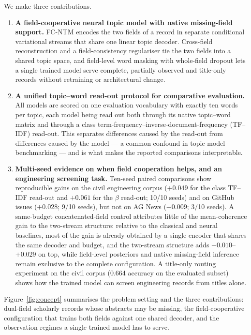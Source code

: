 \documentclass[pdflatex,sn-basic]{sn-jnl}
\newcommand{\fcntm}{FC-NTM}
\begin{document}
We make three contributions.
\begin{enumerate}
\item \textbf{A field-cooperative neural topic model with native missing-field support.}
\fcntm{} encodes the two fields of a record in separate conditional variational streams that
share one linear topic decoder. Cross-field reconstruction and a field-consistency regulariser
tie the two fields into a shared topic space, and field-level word masking with whole-field
dropout lets a single trained model serve complete, partially observed and title-only records
without retraining or architectural change.
\item \textbf{A unified topic--word read-out protocol for comparative evaluation.} All models are
scored on one evaluation vocabulary with exactly ten words per topic, each model being read out
both through its native topic--word matrix and through a class
term-frequency--inverse-document-frequency (TF--IDF) read-out. This separates differences caused
by the read-out from differences caused by the model --- a common confound in topic-model
benchmarking --- and is what makes the reported comparisons interpretable.
\item \textbf{Multi-seed evidence on when field cooperation helps, and an engineering screening
task.} Ten-seed paired comparisons show reproducible gains on the civil engineering
corpus ($+0.049$ for the class TF--IDF read-out and $+0.061$ for the $\beta$ read-out; 10/10
seeds) and on GitHub issues ($+0.028$; 9/10 seeds), but not on AG News ($-0.009$; 3/10 seeds).
A same-budget concatenated-field control attributes little of the mean-coherence gain to the
two-stream structure: relative to the classical and neural baselines, most of the gain is
already obtained by a single encoder that shares the same decoder and budget, and the
two-stream structure adds $+0.010$--$+0.029$ on top, while field-level posteriors and native
missing-field inference remain exclusive to the complete configuration. A title-only routing experiment
on the civil corpus (0.664 accuracy on the evaluated subset) shows how the trained model can
screen engineering records from titles alone.
\end{enumerate}

Figure~\ref{fig:concept} summarises the problem setting and the three contributions: dual-field
scholarly records whose abstracts may be missing, the field-cooperative configuration that
trains both fields against one shared decoder, and the observation regimes a single trained
model has to serve.
\end{document}
